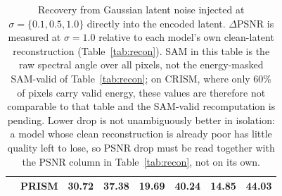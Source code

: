 \documentclass[twoside,11pt]{article}
\begin{document}
\begin{table}[t]
{\begin{tabular}{llcccccc}
      & \textbf{PRISM}         & \textbf{30.72} & \textbf{37.38} & 19.69          & 40.24          & 14.85          & 44.03 \\
    \bottomrule
  \end{tabular}
  }
  \caption{Recovery from Gaussian latent noise injected at $\sigma{=}\{0.1, 0.5, 1.0\}$ directly into the encoded latent. $\Delta$PSNR is measured at $\sigma{=}1.0$ relative to each model's own clean-latent reconstruction (Table~\ref{tab:recon}). SAM in this table is the raw spectral angle over all pixels, not the energy-masked SAM-valid of Table~\ref{tab:recon}; on CRISM, where only 60\% of pixels carry valid energy, these values are therefore not comparable to that table and the SAM-valid recomputation is pending. Lower drop is not unambiguously better in isolation: a model whose clean reconstruction is already poor has little quality left to lose, so PSNR drop must be read together with the PSNR column in Table~\ref{tab:recon}, not on its own.}
  \label{tab:noise}
\end{table}
\end{document}
